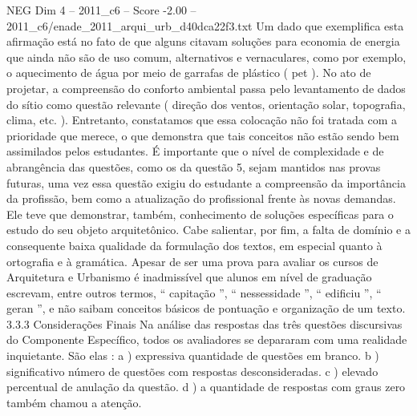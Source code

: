 \begin{textsample}{NEG Dim 4 – 2011\_c6 – Score -2.00 – 2011\_c6/enade\_2011\_arqui\_urb\_d40dca22f3.txt}
Um dado que exemplifica esta afirmação está no fato de que alguns citavam soluções para economia de energia que ainda não são de uso comum, alternativos e vernaculares, como por exemplo, o aquecimento de água por meio de garrafas de plástico ( pet ).
No ato de projetar, a compreensão do conforto ambiental passa pelo levantamento de dados do sítio como questão relevante ( direção dos ventos, orientação solar, topografia, clima, etc. ).
Entretanto, constatamos que essa colocação não foi tratada com a prioridade que merece, o que demonstra que tais conceitos não estão sendo bem assimilados pelos estudantes.
É importante que o nível de complexidade e de abrangência das questões, como os da questão 5, sejam mantidos nas provas futuras, uma vez essa questão exigiu do estudante a compreensão da importância da profissão, bem como a atualização do profissional frente às novas demandas.
Ele teve que demonstrar, também, conhecimento de soluções específicas para o estudo do seu objeto arquitetônico.
Cabe salientar, por fim, a falta de domínio e a consequente baixa qualidade da formulação dos textos, em especial quanto à ortografia e à gramática.
Apesar de ser uma prova para avaliar os cursos de Arquitetura e Urbanismo é inadmissível que alunos em nível de graduação escrevam, entre outros termos, “ capitação ”, “ nessessidade ”, “ edificiu ”, “ geran ”, e não saibam conceitos básicos de pontuação e organização de um texto. 3.3.3 Considerações Finais Na análise das respostas das três questões discursivas do Componente Específico, todos os avaliadores se depararam com uma realidade inquietante.
São elas : a ) expressiva quantidade de questões em branco. b ) significativo número de questões com respostas desconsideradas. c ) elevado percentual de anulação da questão. d ) a quantidade de respostas com graus zero também chamou a atenção.

\end{textsample}
